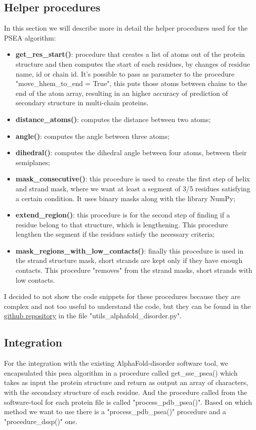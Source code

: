 \subsection{Helper procedures} \label{subsect:helper-procedures}
In this section we will describe more in detail the helper procedures used for the PSEA algorithm:
\begin{itemize}
    \item \textbf{get\_res\_start()}: procedure that creates a list of atoms out of the protein structure and then computes the start of each residues, by changes of residue name, id or chain id. It's possible to pass as parameter to the procedure "move\_hhem\_to\_end = True", this puts those atoms between chains to the end of the atom array, resulting in an higher accuracy of prediction of secondary structure in multi-chain proteins.
    \item \textbf{distance\_atoms()}: computes the distance between two atoms;
    \item \textbf{angle()}: computes the angle between three atoms;
    \item \textbf{dihedral()}: computes the dihedral angle between four atoms, between their semiplanes;
    \item \textbf{mask\_consecutive()}: this procedure is used to create the first step of helix and strand mask, where we want at least a segment of 3/5 residues satisfying a certain condition. It uses binary masks along with the library NumPy;
    \item \textbf{extend\_region()}: this procedure is for the second step of finding if a residue belong to that structure, which is lengthening. This procedure lengthen the segment if the residues satisfy the necessary criteria;
    \item \textbf{mask\_regions\_with\_low\_contacts()}: finally this procedure is used in the strand structure mask, short strands are kept only if they have enough contacts. This procedure "removes" from the strand masks, short strands with low contacts.
\end{itemize}

I decided to not show the code snippets for these procedures because they are complex and not too useful to understand the code, but they can be found in the \href{https://github.com/EvilCrive/AlphaFold-disorder/tree/MobiDB-Alphafold}{\underline{github repository}} in the file "utils\_alphafold\_disorder.py".

\subsection{Integration}
For the integration with the existing AlphaFold-disorder software tool, we encapsulated this psea algorithm in a procedure called get\_sse\_psea() which takes as input the protein structure and return as output an array of characters, with the secondary structure of each residue.
And the procedure called from the software-tool for each protein file is called "process\_pdb\_psea()". Based on which method we want to use there is a "process\_pdb\_psea()" procedure and a "procedure\_dssp()" one.

